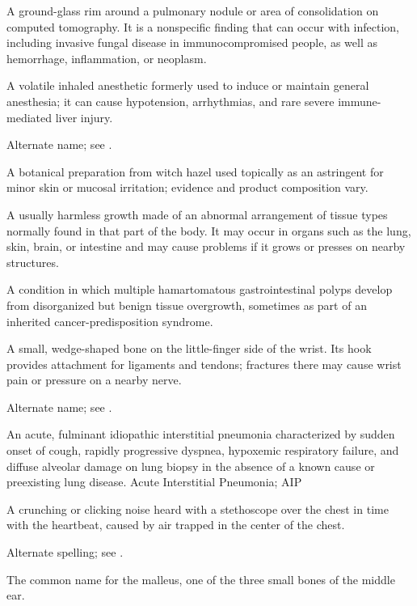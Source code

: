  A ground-glass rim around a pulmonary nodule or area of consolidation on computed tomography. It is a nonspecific finding that can occur with infection, including invasive fungal disease in immunocompromised people, as well as hemorrhage, inflammation, or neoplasm.

 A volatile inhaled anesthetic formerly used to induce or maintain general anesthesia; it can cause hypotension, arrhythmias, and rare severe immune-mediated liver injury.

 Alternate name; see .

 A botanical preparation from witch hazel used topically as an astringent for minor skin or mucosal irritation; evidence and product composition vary.

 A usually harmless growth made of an abnormal arrangement of tissue types normally found in that part of the body. It may occur in organs such as the lung, skin, brain, or intestine and may cause problems if it grows or presses on nearby structures.

 A condition in which multiple hamartomatous gastrointestinal polyps develop from disorganized but benign tissue overgrowth, sometimes as part of an inherited cancer-predisposition syndrome.

 A small, wedge-shaped bone on the little-finger side of the wrist. Its hook provides attachment for ligaments and tendons; fractures there may cause wrist pain or pressure on a nearby nerve.

 Alternate name; see .

 An acute, fulminant idiopathic interstitial pneumonia characterized by sudden onset of cough, rapidly progressive dyspnea, hypoxemic respiratory failure, and diffuse alveolar damage on lung biopsy in the absence of a known cause or preexisting lung disease.
\synonyms
Acute Interstitial Pneumonia; AIP

 A crunching or clicking noise heard with a stethoscope over the chest in time with the heartbeat, caused by air trapped in the center of the chest.

 Alternate spelling; see .

 The common name for the malleus, one of the three small bones of the middle ear.


